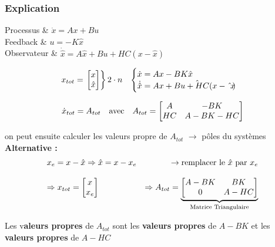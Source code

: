 \documentclass[document.tex]{subfiles}
\begin{document}
\subsubsection{Explication}
\begin{conditions}
	Processus & $\dot{x} = A x + B u$ \\
	Feedback & $u = -K\hat{x}$\\
	Observateur & $\dot{\hat{x}}= A \hat{x} + B u + HC(x-\hat{x})$
\end{conditions}

$$
 \begin{array}{l r}
 x_{tot} = \left. \begin{bmatrix} x \\ \hat{x}\end{bmatrix} \right \} 2\cdot n & \begin{cases} \dot{x}=Ax - BK\hat{x} \\ \dot{\hat{x}} = A\hat{x + Bu + HC(x-\hat{x})} \end{cases}
 \end{array}
$$

$$
\begin{array}{l c r}
\dot{x}_{tot} = A_{tot} & \text{avec} & A_{tot} = \begin{bmatrix} A & -BK \\ HC & A-BK-HC \end{bmatrix}
\end{array} 
$$ 

on peut ensuite calculer les valeurs propre de $A_{tot}$ $\longrightarrow$ pôles du systèmes \\

\textbf{Alternative : } 
$$ \begin{array}{l r}
 x_e = x-\hat{x} \Rightarrow \hat{x} = x - x_e 
& \rightarrow \text{remplacer le } \hat{x} \text{ par } x_e \\[12pt]
 \Rightarrow x_{tot} = \begin{bmatrix} x  \\ x_e\end{bmatrix} & \Rightarrow A_{tot} = \underbrace{\begin{bmatrix}
A-BK & BK \\ 0 & A-HC\end{bmatrix}}_{\text{Matrice Triangulaire}}
\end{array} $$

Les v\textbf{aleurs propres} de \underline{$A_{tot}$} sont les \textbf{valeurs propres} de \underline{$A-BK$} et les \textbf{valeurs propres} de \underline{$A-HC$}
\end{document}
